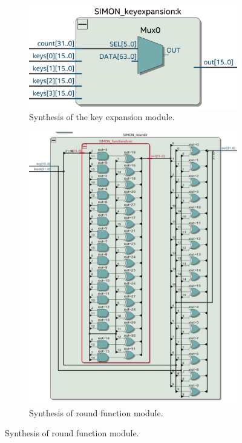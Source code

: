 \documentclass[12pt,twoside,a4paper]{report}
\begin{document}
    \begin{figure}[H]
    \begin{subfigure}[H]{0.5\textwidth}
            \includegraphics[width=\textwidth]{SYNTH_KEY}
            \centering
            \caption{Synthesis of the key expansion module.}
            \label{SYNTH_KEY}
    \end{subfigure}
    \begin{subfigure}[H]{0.5\textwidth}
            \includegraphics[width=\textwidth]{SYNTH_ROUND}
            \centering
            \caption{Synthesis of round function module.}
            \label{SYNTH_ROUND}
    \end{subfigure}
    \end{figure}
\end{document}
